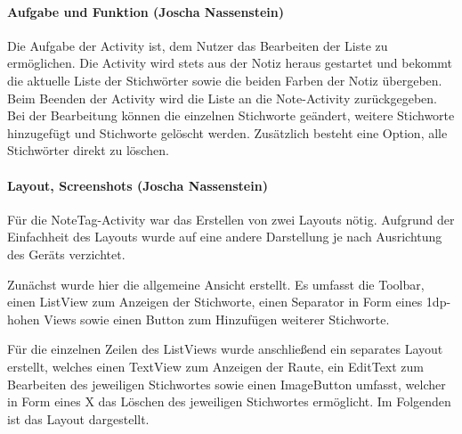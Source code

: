 \paragraph{Aufgabe und Funktion (Joscha Nassenstein)}
Die Aufgabe der Activity ist, dem Nutzer das Bearbeiten der Liste zu ermöglichen. Die Activity wird stets aus der Notiz heraus gestartet und bekommt die aktuelle Liste der Stichwörter sowie die beiden Farben der Notiz übergeben. Beim Beenden der Activity wird die Liste an die Note-Activity zurückgegeben. Bei der Bearbeitung können die einzelnen Stichworte geändert, weitere Stichworte hinzugefügt und Stichworte gelöscht werden. Zusätzlich besteht eine Option, alle Stichwörter direkt zu löschen.

\paragraph{Layout, Screenshots (Joscha Nassenstein)}
Für die NoteTag-Activity war das Erstellen von zwei Layouts nötig. Aufgrund der Einfachheit des Layouts wurde auf eine andere Darstellung je nach Ausrichtung des Geräts verzichtet.

Zunächst wurde hier die allgemeine Ansicht erstellt. Es umfasst die Toolbar, einen ListView zum Anzeigen der Stichworte, einen Separator in Form eines 1dp-hohen Views sowie einen Button zum Hinzufügen weiterer Stichworte.

Für die einzelnen Zeilen des ListViews wurde anschließend ein separates Layout erstellt, welches einen TextView zum Anzeigen der Raute, ein EditText zum Bearbeiten des jeweiligen Stichwortes sowie einen ImageButton umfasst, welcher in Form eines X das Löschen des jeweiligen Stichwortes ermöglicht.
Im Folgenden ist das Layout dargestellt.

